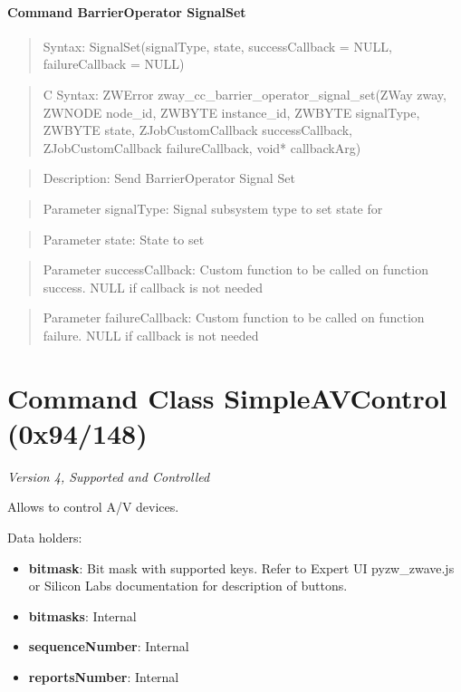 \paragraph{Command BarrierOperator SignalSet}
\begin{quote}Syntax: SignalSet(signalType, state, successCallback = NULL, failureCallback = NULL)\end{quote}
\begin{quote}C Syntax: ZWError zway\_cc\_barrier\_operator\_signal\_set(ZWay zway, ZWNODE node\_id, ZWBYTE instance\_id, ZWBYTE signalType, ZWBYTE state, ZJobCustomCallback successCallback, ZJobCustomCallback failureCallback, void* callbackArg)\end{quote}
\begin{quote}Description: Send BarrierOperator Signal Set\end{quote}
\begin{quote}Parameter signalType: Signal subsystem type to set state for\end{quote}
\begin{quote}Parameter state: State to set\end{quote}
\begin{quote}Parameter successCallback: Custom function to be called on function success. NULL if callback is not needed\end{quote}
\begin{quote}Parameter failureCallback: Custom function to be called on function failure. NULL if callback is not needed\end{quote}



\section{Command Class SimpleAVControl (0x94/148)}

\textit{Version 4, Supported and Controlled}
\newline

Allows to control A/V devices.
\newline

\noindent
Data holders:

\begin{itemize}
\item \textbf{bitmask}: Bit mask with supported keys. Refer to Expert UI pyzw\_zwave.js or Silicon Labs documentation for description of buttons.
\item \textbf{bitmasks}: Internal
\item \textbf{sequenceNumber}: Internal
\item \textbf{reportsNumber}: Internal
\end{itemize}

